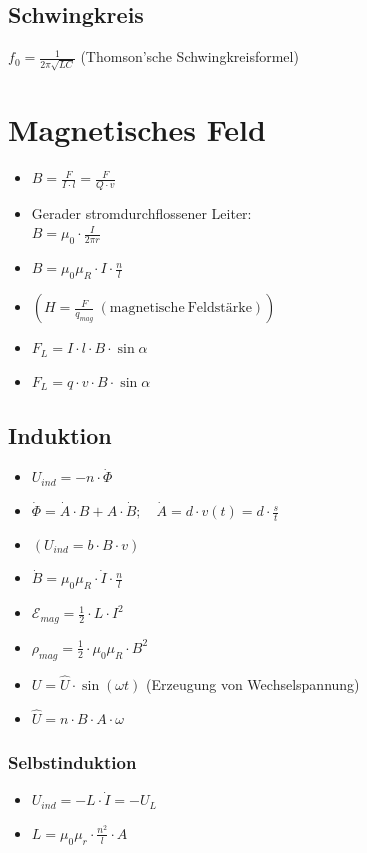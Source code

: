 \documentclass[paper = a4, twocolumn]{scrartcl}
\DeclareRobustCommand{\E}{\mathcal{E}}
\begin{document}
\subsection{Schwingkreis}
\( f_0 = \frac{1}{2 \pi \sqrt{LC}} \) (Thomson’sche Schwingkreisformel)

\section{Magnetisches Feld}
\begin{itemize}
\item
	\( B = \frac{F}{I \cdot l} = \frac{F}{Q \cdot v} \)
\item
	Gerader stromdurchflossener Leiter:\\
	\( B = \mu_0 \cdot \frac{I}{2 \pi r} \)
\item
	\( B = \mu_0 \mu_R \cdot I \cdot \frac{n}{l} \)
\item
	\( \left( H = \frac{F}{q_{mag}}\ \mathrm{(magnetische\ Feldstärke)} \right)
	\)
\item
	\( F_L = I \cdot l \cdot B \cdot \sin \alpha  \)
\item
	\( F_L =  q \cdot v \cdot B \cdot \sin \alpha \)
\end{itemize}

\subsection{Induktion}
\begin{itemize}
\item
	\( U_{ind} = -n \cdot \dot{\Phi} \)
\item
	\( \dot{\Phi} = \dot{A} \cdot B + A \cdot \dot{B}; \quad \dot{A} = d \cdot
	v(t) = d \cdot \frac{s}{t} \)
\item
	\(\left(  U_{ind} = b \cdot B \cdot v \right)\)
\item
	\( \dot{B} = \mu_0 \mu_R \cdot \dot{I} \cdot \frac{n}{l} \)
\item
	\( \E_{mag} = \frac{1}{2} \cdot L \cdot I^2 \)
\item
	\( \rho_{mag} = \frac{1}{2} \cdot \mu_0 \mu_R \cdot B^2 \)
\item
	\( U = \hat{U} \cdot \sin(\omega t) \) (Erzeugung von Wechselspannung)
\item
	\( \hat{U} = n \cdot B \cdot A \cdot \omega \)
\end{itemize}

\subsubsection{Selbstinduktion}
\begin{itemize}
\item
	\( U_{ind} = -L \cdot \dot{I} = -U_L \)
\item
	\( L = \mu_0 \mu_r \cdot \frac{n^2}{l} \cdot A \)
\end{itemize}
\end{document}
